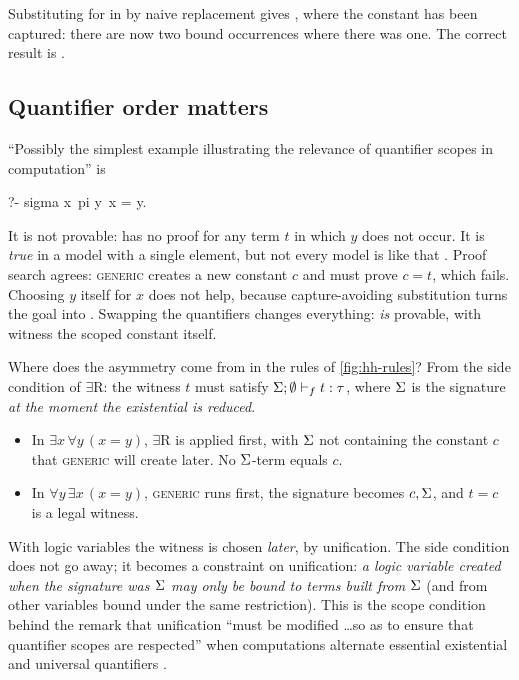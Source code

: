 {\begin{example}[\book{85}]
Substituting  for  in  by naive replacement gives
, where the constant  has been captured: there are now two bound
occurrences where there was one. The correct result is .
\end{example}

\subsection{Quantifier order matters}\label{sec:hh-scope}

``Possibly the simplest example illustrating the relevance of quantifier scopes in computation'' is
\begin{lprolog}
?- sigma x\ pi y\ x = y.
\end{lprolog}
It is not provable:  has no proof for any term $t$ in which $y$ does not occur. It is
\emph{true} in a model with a single element, but not every model is like that . Proof
search agrees: \textsc{generic} creates a new constant $c$ and must prove $c=t$, which fails. Choosing
$y$ itself for $x$ does not help, because capture-avoiding substitution turns the goal into
 . Swapping the quantifiers changes everything: 
\emph{is} provable, with witness the scoped constant itself.

\begin{tutorial}
Where does the asymmetry come from in the rules of \cref{fig:hh-rules}? From the side condition of
$\exists$R: the witness $t$ must satisfy $\Sigma;\emptyset\vdash_f t:\tau$, where $\Sigma$ is the signature
\emph{at the moment the existential is reduced}.
\begin{itemize}
  \item In $\exists x\,\forall y\,(x=y)$, $\exists$R is applied first, with $\Sigma$ not containing the
        constant $c$ that \textsc{generic} will create later. No $\Sigma$-term equals $c$.
  \item In $\forall y\,\exists x\,(x=y)$, \textsc{generic} runs first, the signature becomes $c,\Sigma$, and
        $t=c$ is a legal witness.
\end{itemize}
With logic variables the witness is chosen \emph{later}, by unification. The side condition does not go
away; it becomes a constraint on unification: \emph{a logic variable created when the signature was
$\Sigma$ may only be bound to terms built from $\Sigma$} (and from other variables bound under the same
restriction). This is the scope condition behind the remark that unification ``must be modified \dots so
as to ensure that quantifier scopes are respected'' when \fohh{} computations alternate essential
existential and universal quantifiers .
\end{tutorial}

}
